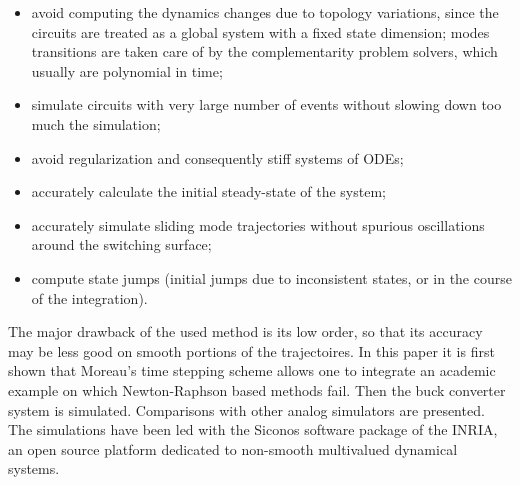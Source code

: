 \begin{itemize}

\item avoid computing the dynamics changes due to topology variations, since the circuits are treated as a global system with a fixed state dimension; modes transitions are taken care of by the complementarity problem solvers, which usually are polynomial in time;

\item simulate circuits with very large number of events without slowing down too much the simulation;

\item avoid regularization and consequently stiff systems of ODEs;

\item accurately calculate the initial steady-state of the system;

\item accurately simulate sliding mode trajectories without spurious oscillations around the switching surface;

\item compute state jumps (initial jumps due to inconsistent states, or in the course of the integration). 

\end{itemize}


The major drawback of the used method is its low order, so that its accuracy may be less good on smooth portions of the trajectoires. In this paper it is first shown that Moreau's time stepping scheme allows one to integrate an academic example on which Newton-Raphson based methods fail. Then the buck converter system is simulated. Comparisons with other analog simulators are presented. The simulations have been led with the {\sc Siconos} software package of the INRIA, an open source platform dedicated to non-smooth multivalued dynamical systems. 




